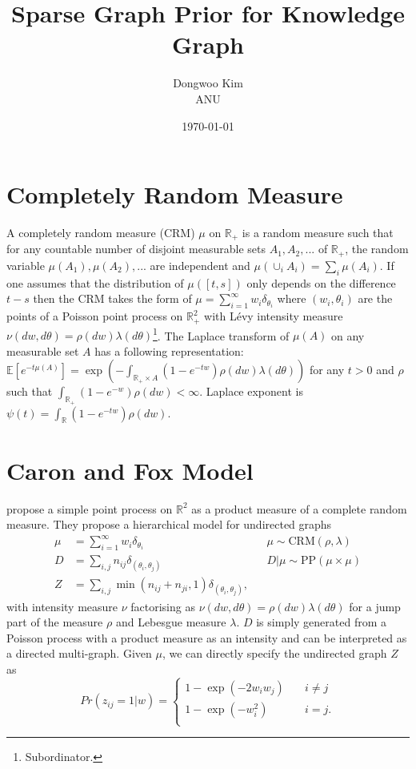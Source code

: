 \documentclass{article}
\title{Sparse Graph Prior for Knowledge Graph}
\date{\today}
\author{Dongwoo Kim\\ANU}
\begin{document}
\maketitle

\section{Completely Random Measure}
A completely random measure (CRM) $\mu$ on $\mathbb{R}_+$ is a random measure such that for any countable number of disjoint measurable sets $A_1, A_2, ...$ of $\mathbb{R}_+$, the random variable $\mu(A_1), \mu(A_2), ...$ are independent and $\mu(\cup_i A_i) = \sum_i \mu(A_i)$. If one assumes that the distribution of $\mu([t,s])$ only depends on the difference $t-s$ then the CRM takes the form of $\mu = \sum_{i=1}^{\infty}w_i\delta_{\theta_i}$ where $(w_i, \theta_i)$ are the points of a Poisson point process on $\mathbb{R}_+^2$ with L\'{e}vy intensity measure $\nu(dw, d\theta) = \rho(dw)\lambda(d\theta)$\footnote{Subordinator.}. The Laplace transform of $\mu(A)$ on any measurable set $A$ has a following representation: $\mathbb{E}[e^{-t\mu(A)}] = \exp(-\int_{\mathbb{R}_+ \times A}(1-e^{-tw})\rho(dw)\lambda(d\theta))$ for any $t>0$ and $\rho$ such that $\int_{\mathbb{R}_+}(1-e^{-w})\rho(dw) < \infty$. Laplace exponent is $\psi(t) = \int_{\mathbb{R}} (1 - e^{-t w}) \rho(dw)$.

\section{Caron and Fox Model}

\cite{Caron2015} propose a simple point process on $\mathbb{R}^2$ as a product measure of a complete random measure. They propose a hierarchical model for undirected graphs
\begin{align}
\mu &= \sum_{i=1}^{\infty} w_i \delta_{\theta_i} & &\mu \sim \text{CRM}(\rho, \lambda)\\
D &= \sum_{i,j} n_{ij} \delta_{(\theta_i, \theta_j)} & &D|\mu \sim \text{PP}(\mu \times \mu)\\
Z &=\sum_{i,j} \min(n_{ij} + n_{ji}, 1)\delta_{(\theta_i, \theta_j)}, \label{eqn:cnf}&&
\end{align}
with intensity measure $\nu$ factorising as $\nu(dw, d\theta) = \rho(dw) \lambda(d\theta)$ for a jump part of the measure $\rho$ and Lebesgue measure $\lambda$. $D$ is simply generated from a Poisson process with a product measure as an intensity and can be interpreted as a directed multi-graph.
Given $\mu$, we can directly specify the undirected graph $Z$ as
\[ Pr(z_{ij}=1|w) = 
  \begin{cases}
    1 - \exp(-2w_iw_j)       & \quad i \neq j\\
    1 - \exp(-w_i^2) & \quad i = j.\\
  \end{cases}
\]
\end{document}
